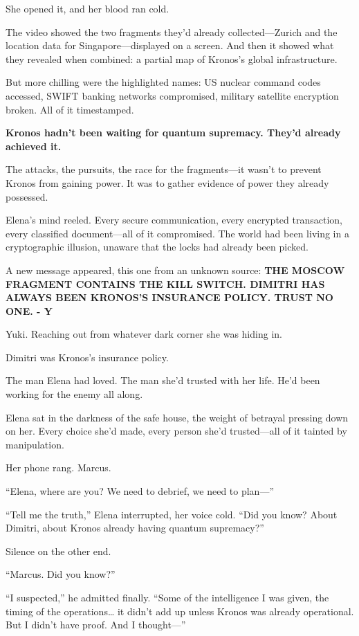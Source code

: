 She opened it, and her blood ran cold.

The video showed the two fragments they'd already collected---Zurich and
the location data for Singapore---displayed on a screen. And then it
showed what they revealed when combined: a partial map of Kronos's
global infrastructure.

But more chilling were the highlighted names: US nuclear command codes
accessed, SWIFT banking networks compromised, military satellite
encryption broken. All of it timestamped.

\textbf{Kronos hadn't been waiting for quantum supremacy. They'd already
achieved it.}

The attacks, the pursuits, the race for the fragments---it wasn't to
prevent Kronos from gaining power. It was to gather evidence of power
they already possessed.

Elena's mind reeled. Every secure communication, every encrypted
transaction, every classified document---all of it compromised. The
world had been living in a cryptographic illusion, unaware that the
locks had already been picked.

A new message appeared, this one from an unknown source: \textbf{THE
MOSCOW FRAGMENT CONTAINS THE KILL SWITCH. DIMITRI HAS ALWAYS BEEN
KRONOS'S INSURANCE POLICY. TRUST NO ONE. - Y}

Yuki. Reaching out from whatever dark corner she was hiding in.

Dimitri was Kronos's insurance policy.

The man Elena had loved. The man she'd trusted with her life. He'd been
working for the enemy all along.

Elena sat in the darkness of the safe house, the weight of betrayal
pressing down on her. Every choice she'd made, every person she'd
trusted---all of it tainted by manipulation.

Her phone rang. Marcus.

``Elena, where are you? We need to debrief, we need to plan---''

``Tell me the truth,'' Elena interrupted, her voice cold. ``Did you
know? About Dimitri, about Kronos already having quantum supremacy?''

Silence on the other end.

``Marcus. Did you know?''

``I suspected,'' he admitted finally. ``Some of the intelligence I was
given, the timing of the operations\ldots{} it didn't add up unless
Kronos was already operational. But I didn't have proof. And I
thought---''

